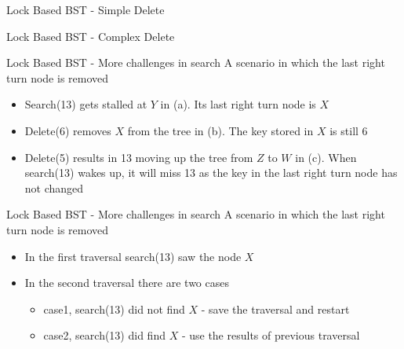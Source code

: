 \begin{frame}[c]{Lock Based BST - Simple Delete}

\end{frame}

\begin{frame}[c]{Lock Based BST - Complex Delete}

\end{frame}

\begin{frame}{Lock Based BST - More challenges in search}
A scenario in which the last right turn node is removed

\begin{itemize}
\item<1> \footnotesize Search(13) gets stalled at $Y$ in (a). Its last right turn node is $X$
\item<2> \footnotesize Delete(6) removes $X$ from the tree in (b). The key stored in $X$ is still 6
\item<3> \footnotesize Delete(5) results in 13 moving up the tree from $Z$ to $W$ in (c). When search(13) wakes up, it will miss 13 as the key in the last right turn node has not changed
\end{itemize}
\end{frame}

\begin{frame}{Lock Based BST - More challenges in search}
A scenario in which the last right turn node is removed

\begin{itemize}
\item<1> \footnotesize In the first traversal search(13) saw the node $X$
\item<2> \footnotesize In the second traversal there are two cases
\begin{itemize}
\item<2> \tiny case1, search(13) did not find $X$ - save the traversal and restart
\item<2> \tiny case2, search(13) did find $X$ - use the results of previous traversal
\end{itemize}
\end{itemize}

\end{frame}